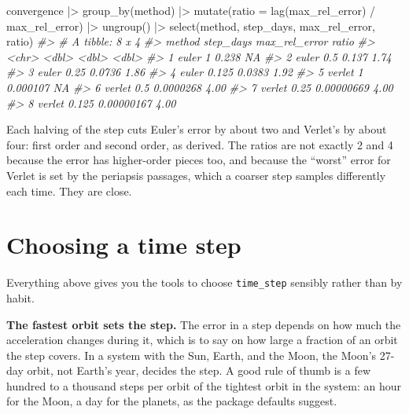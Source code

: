 \documentclass[
  10.5pt,
  letterpaper,
]{scrbook}
\newenvironment{Shaded}{\begin{snugshade}}{\end{snugshade}}
\newcommand{\AttributeTok}[1]{\textcolor[rgb]{0.00,0.00,0.00}{#1}}
\newcommand{\CommentTok}[1]{\textcolor[rgb]{0.00,0.00,0.00}{\textit{#1}}}
\newcommand{\FunctionTok}[1]{\textcolor[rgb]{0.00,0.00,0.00}{#1}}
\newcommand{\NormalTok}[1]{\textcolor[rgb]{0.00,0.00,0.00}{#1}}
\newcommand{\SpecialCharTok}[1]{\textcolor[rgb]{0.00,0.00,0.00}{#1}}
\theoremstyle{definition}
\theoremstyle{plain}
\theoremstyle{remark}
\begin{document}
\begin{Shaded}
\begin{Highlighting}[]
\NormalTok{convergence }\SpecialCharTok{|\textgreater{}}
  \FunctionTok{group\_by}\NormalTok{(method) }\SpecialCharTok{|\textgreater{}}
  \FunctionTok{mutate}\NormalTok{(}\AttributeTok{ratio =} \FunctionTok{lag}\NormalTok{(max\_rel\_error) }\SpecialCharTok{/}\NormalTok{ max\_rel\_error) }\SpecialCharTok{|\textgreater{}}
  \FunctionTok{ungroup}\NormalTok{() }\SpecialCharTok{|\textgreater{}}
  \FunctionTok{select}\NormalTok{(method, step\_days, max\_rel\_error, ratio)}
\CommentTok{\#\textgreater{} \# A tibble: 8 x 4}
\CommentTok{\#\textgreater{}   method step\_days max\_rel\_error ratio}
\CommentTok{\#\textgreater{}   \textless{}chr\textgreater{}      \textless{}dbl\textgreater{}         \textless{}dbl\textgreater{} \textless{}dbl\textgreater{}}
\CommentTok{\#\textgreater{} 1 euler      1        0.238      NA   }
\CommentTok{\#\textgreater{} 2 euler      0.5      0.137       1.74}
\CommentTok{\#\textgreater{} 3 euler      0.25     0.0736      1.86}
\CommentTok{\#\textgreater{} 4 euler      0.125    0.0383      1.92}
\CommentTok{\#\textgreater{} 5 verlet     1        0.000107   NA   }
\CommentTok{\#\textgreater{} 6 verlet     0.5      0.0000268   4.00}
\CommentTok{\#\textgreater{} 7 verlet     0.25     0.00000669  4.00}
\CommentTok{\#\textgreater{} 8 verlet     0.125    0.00000167  4.00}
\end{Highlighting}
\end{Shaded}

Each halving of the step cuts Euler's error by about two and Verlet's by
about four: first order and second order, as derived. The ratios are not
exactly 2 and 4 because the error has higher-order pieces too, and
because the ``worst'' error for Verlet is set by the periapsis passages,
which a coarser step samples differently each time. They are close.

\section{Choosing a time step}\label{choosing-a-time-step}

Everything above gives you the tools to choose \texttt{time\_step}
sensibly rather than by habit.

\textbf{The fastest orbit sets the step.} The error in a step depends on
how much the acceleration changes during it, which is to say on how
large a fraction of an orbit the step covers. In a system with the Sun,
Earth, and the Moon, the Moon's 27-day orbit, not Earth's year, decides
the step. A good rule of thumb is a few hundred to a thousand steps per
orbit of the tightest orbit in the system: an hour for the Moon, a day
for the planets, as the package defaults suggest.
\end{document}
